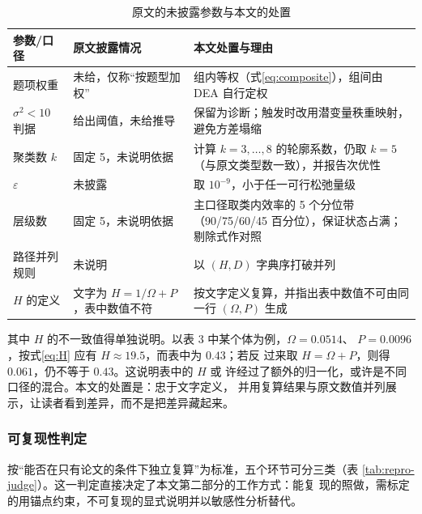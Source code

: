 \begin{table}[htbp]
\centering
\tabfont
\caption{原文的未披露参数与本文的处置}
\label{tab:df}
\begin{tabularx}{\textwidth}{@{}p{2.5cm}p{3.5cm}X@{}}
\toprule
参数/口径 & 原文披露情况 & 本文处置与理由 \\
\midrule
题项权重 & 未给，仅称“按题型加权” &
  组内等权（式\eqref{eq:composite}），组间由 DEA 自行定权 \\
$\sigma^2<10$ 判据 & 给出阈值，未给推导 &
  保留为诊断；触发时改用潜变量秩重映射，避免方差塌缩 \\
聚类数 $k$ & 固定 5，未说明依据 &
  计算 $k=3,\dots,8$ 的轮廓系数，仍取 $k=5$（与原文类型数一致），并报告次优性 \\
$\varepsilon$ & 未披露 & 取 $10^{-9}$，小于任一可行松弛量级 \\
层级数 & 固定 5，未说明依据 &
  主口径取类内效率的 5 个分位带（90/75/60/45 百分位），保证状态占满；剔除式作对照 \\
路径并列规则 & 未说明 &
  以 $(H,D)$ 字典序打破并列 \\
$H$ 的定义 & 文字为 $H=1/\Omega+P$，表中数值不符 &
  按文字定义复算，并指出表中数值不可由同一行 $(\Omega,P)$ 生成 \\
\bottomrule
\end{tabularx}
\end{table}

其中 $H$ 的不一致值得单独说明。以表 3 中某个体为例，$\Omega=0.0514$、
$P=0.0096$，按式\eqref{eq:H} 应有 $H\approx19.5$，而表中为 $0.43$；若反
过来取 $H=\Omega+P$，则得 $0.061$，仍不等于 $0.43$。这说明表中的 $H$ 或
许经过了额外的归一化，或许是不同口径的混合。本文的处置是：忠于文字定义，
并用复算结果与原文数值并列展示，让读者看到差异，而不是把差异藏起来。

\subsubsection{可复现性判定}

按“能否在只有论文的条件下独立复算”为标准，五个环节可分三类（表
\ref{tab:repro-judge}）。这一判定直接决定了本文第二部分的工作方式：能复
现的照做，需标定的用锚点约束，不可复现的显式说明并以敏感性分析替代。


